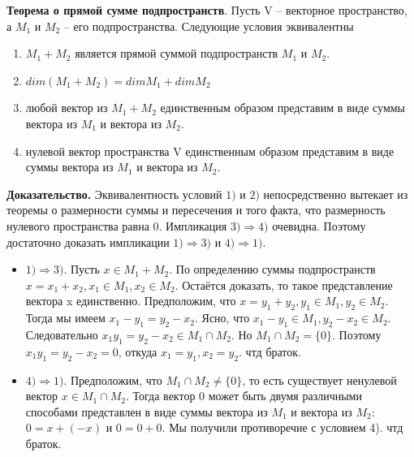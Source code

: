 \documentclass[a4paper]{article}
\begin{document}
    \begin{htheorem}
        \textbf{Теорема о прямой сумме подпространств}. Пусть V – векторное пространство, а $M_1$ и $M_2$ – его подпространства. Следующие условия эквивалентны \begin{enumerate}
                                                                                                                                                                    \item $M_1 + M_2$ является прямой суммой подпространств $M_1$ и $M_2$.
                                                                                                                                                                    \item $dim(M_1+M_2) = dim M_1 + dim M_2$
                                                                                                                                                                    \item любой вектор из $M_1+M_2$ единственным образом представим в виде суммы вектора из $M_1$ и вектора из $M_2$.
                                                                                                                                                                    \item нулевой вектор пространства V единственным образом представим в виде суммы вектора из $M_1$ и вектора из $M_2$.
        \end{enumerate}
    \end{htheorem}

    \begin{hproof}
        \textbf{Доказательство.} Эквивалентность условий $1)$ и $2)$ непосредственно
        вытекает из теоремы о размерности суммы и пересечения и того факта,
        что размерность нулевого пространства равна 0. Импликация $3) \Rightarrow 4)$
        очевидна. Поэтому достаточно доказать импликации $1) \Rightarrow 3)$ и $4) \Rightarrow 1)$.

        \begin{itemize}
            \item $1) \Rightarrow 3)$. Пусть $x \in M_1 + M_2$. По определению суммы подпространств $x = x_1 + x_2, x_1 \in M_1, x_2 \in M_2$. Остаётся доказать, то такое представление вектора x единственно. Предположим, что $x = y_1 + y_2, y_1 \in M_1, y_2 \in M_2$. Тогда мы имеем $x_1-y_1 = y_2 - x_2$. Ясно, что $x_1 - y_1 \in M_1, y_2-x_2 \in M_2$. Следовательно $x_1y_1 = y_2 - x_2 \in M_1 \cap M_2$.
            Но $M_1 \cap M_2 = \{ 0 \}$. Поэтому $x_1y_1 = y_2 - x_2 = 0$, откуда $x_1 = y_1, x_2 = y_2$. чтд браток.

            \item $4) \Rightarrow 1)$. Предположим, что $M_1 \cap M_2 \neq \{ 0 \}$, то есть существует ненулевой вектор $x \in M_1 \cap M_2$. Тогда вектор 0 может быть двумя различными способами представлен в виде суммы вектора из $M_1$ и вектора из $M_2$: $0 = x+(-x)$ и $0 = 0+0$. Мы получили противоречие с условием 4). чтд браток.
        \end{itemize}
    \end{hproof}
\end{document}
